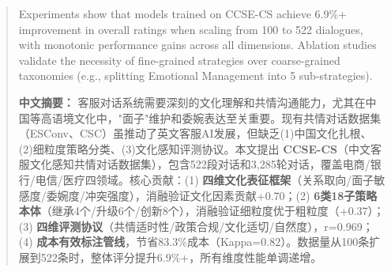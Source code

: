 \documentclass{article}
\begin{document}
\begin{abstract}
Experiments show that models trained on CCSE-CS achieve 6.9\%+ improvement in overall ratings when scaling from 100 to 522 dialogues, with monotonic performance gains across all dimensions. Ablation studies validate the necessity of fine-grained strategies over coarse-grained taxonomies (e.g., splitting Emotional Management into 5 sub-strategies).

\textbf{中文摘要：} 客服对话系统需要深刻的文化理解和共情沟通能力，尤其在中国等高语境文化中，"面子"维护和委婉表达至关重要。现有共情对话数据集（ESConv、CSC）虽推动了英文客服AI发展，但缺乏(1)中国文化扎根、(2)细粒度策略分类、(3)文化感知评测协议。本文提出 \textbf{CCSE-CS}（中文客服文化感知共情对话数据集），包含522段对话和3,285轮对话，覆盖电商/银行/电信/医疗四领域。核心贡献：(1) \textbf{四维文化表征框架}（关系取向/面子敏感度/委婉度/冲突强度），消融验证文化因素贡献+0.70；(2) \textbf{6类18子策略本体}（继承4个/升级6个/创新8个），消融验证细粒度优于粗粒度（+0.37）；(3) \textbf{四维评测协议}（共情适时性/政策合规/文化适切/自然度），r=0.969；(4) \textbf{成本有效标注管线}，节省83.3\%成本（Kappa=0.82）。数据量从100条扩展到522条时，整体评分提升6.9\%+，所有维度性能单调递增。
\end{abstract}

%





\end{document}
